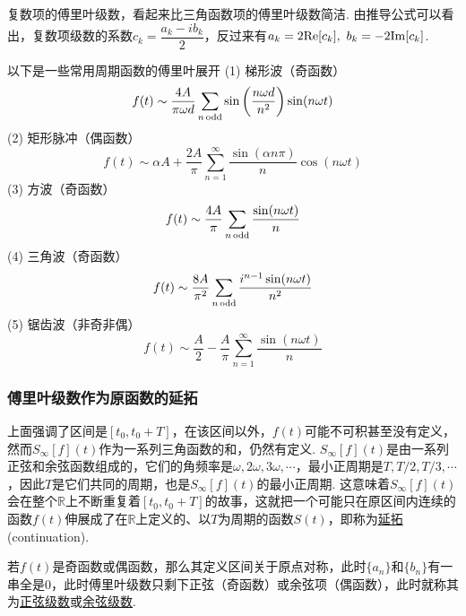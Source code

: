 \documentclass[main.tex]{subfiles}
\begin{document}
复数项的傅里叶级数，看起来比三角函数项的傅里叶级数简洁. 由推导公式可以看出，复数项级数的系数\(c_k=\dfrac{a_k-ib_k}{2}\)，反过来有\(a_k=2{\rm Re}[c_k], \,\, b_k=-2{\rm Im}[c_k]\).

以下是一些常用周期函数的傅里叶展开
\newline
(1) 梯形波（奇函数）
\[f(t)\sim\frac{4A}{\pi\omega d}\sum_{n\,{\rm odd}}\sin\left(\frac{n\omega d}{n^2}\right)\sin(n\omega t)\]
(2) 矩形脉冲（偶函数）
\[f(t)\sim\alpha A + \frac{2A}{\pi}\sum_{n=1}^{\infty}\frac{\sin(\alpha n \pi)}{n} \cos(n\omega t)\]
(3) 方波（奇函数）
\[f(t) \sim \frac{4A}{\pi}\sum_{n\,{\rm odd}} \frac{\sin(n\omega t)}{n}\]
(4) 三角波（奇函数）
\[f(t) \sim \frac{8A}{\pi^2}\sum_{n\,{\rm odd}}\frac{i^{n-1}\sin(n\omega t)}{n^2}\]
(5) 锯齿波（非奇非偶）
\[f(t) \sim \frac{A}{2}-\frac{A}{\pi}\sum_{n=1}^{\infty} \frac{\sin(n\omega t)}{n}\]


\vspace{1cm}

\subsubsection{傅里叶级数作为原函数的延拓}

上面强调了区间是\([t_0,t_0+T]\)，在该区间以外，\(f(t)\)可能不可积甚至没有定义，然而\(S_{\infty}[f](t)\)作为一系列三角函数的和，仍然有定义. \(S_{\infty}[f](t)\)是由一系列正弦和余弦函数组成的，它们的角频率是\(\omega, 2\omega, 3\omega, \cdots\)，最小正周期是\(T, T/2, T/3, \cdots\)，因此\(T\)是它们共同的周期，也是\(S_{\infty}[f](t)\)的最小正周期. 这意味着\(S_{\infty}[f](t)\)会在整个\(\mathbb{R}\)上不断重复着\([t_0,t_0+T]\)的故事，这就把一个可能只在原区间内连续的函数\(f(t)\)伸展成了在\(\mathbb{R}\)上定义的、以\(T\)为周期的函数\(S(t)\)，即称为\uline{延拓}(continuation).

若\(f(t)\)是奇函数或偶函数，那么其定义区间关于原点对称，此时\(\{a_n\}\)和\(\{b_n\}\)有一串全是\(0\)，此时傅里叶级数只剩下正弦（奇函数）或余弦项（偶函数），此时就称其为\uline{正弦级数}或\uline{余弦级数}. 
\end{document}
